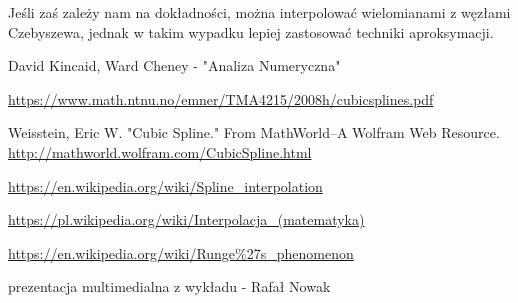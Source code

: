 \documentclass{article}
\begin{document}
Jeśli zaś zależy nam na dokładności, można interpolować wielomianami z węzłami Czebyszewa, jednak w takim wypadku lepiej zastosować techniki aproksymacji.


\begin{thebibliography}{9}
	\itemsep2pt
			
	 David Kincaid, Ward Cheney - "Analiza Numeryczna"
	
	 \url{https://www.math.ntnu.no/emner/TMA4215/2008h/cubicsplines.pdf}
	
	 Weisstein, Eric W. "Cubic Spline." From MathWorld--A Wolfram Web Resource. \url{http://mathworld.wolfram.com/CubicSpline.html}
	
	 \url{https://en.wikipedia.org/wiki/Spline_interpolation}
	
	\url{https://pl.wikipedia.org/wiki/Interpolacja_(matematyka)}
	
	\url{https://en.wikipedia.org/wiki/Runge%27s_phenomenon}
		
	prezentacja multimedialna z wykładu - Rafał Nowak
	 
\end{thebibliography}
\end{document}
